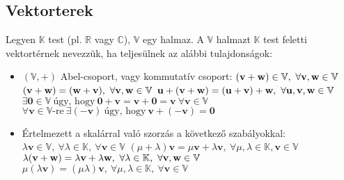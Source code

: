 \subsection{Vektorterek}
Legyen $\mathbb{K}$ test (pl. $\mathbb{R}$ vagy $\mathbb{C}$), $\mathbb{V}$ egy halmaz. A $\mathbb{V}$ halmazt $\mathbb{K}$ test feletti
vektortérnek nevezzük, ha teljesülnek az alábbi tulajdonságok:
\begin{itemize}
\item $(\mathbb{V}, +)$ Abel-csoport, vagy kommutatív csoport:
\subitem $(\mathbf{v} + \mathbf{w}) \in \mathbb{V}, ~ \forall \mathbf{v}, \mathbf{w} \in \mathbb{V}$
\subitem $(\mathbf{v} + \mathbf{w}) = (\mathbf{w} + \mathbf{v}), ~ \forall \mathbf{v}, \mathbf{w} \in \mathbb{V}$
\subitem $\mathbf{u} + (\mathbf{v} + \mathbf{w}) =(\mathbf{u} + \mathbf{v}) + \mathbf{w}, ~ \forall \mathbf{u},\mathbf{v}, \mathbf{w} \in \mathbb{V}$
\subitem $\exists \mathbf{0} \in \mathbb{V} ~ \textrm{úgy, hogy} ~ \mathbf{0} + \mathbf{v} = \mathbf{v} + \mathbf{0} = \mathbf{v} ~ \forall \mathbf{v}\in\mathbb{V}$
\subitem $ \forall \mathbf{v}\in\mathbb{V}\textrm{-re} ~ \exists (-\mathbf{v}) ~ \textrm{úgy, hogy} ~  \mathbf{v}+(-\mathbf{v})=\mathbf{0}$

\item Értelmezett a skalárral való szorzás a következő szabályokkal:
\subitem $\lambda \mathbf{v} \in \mathbb V, ~ \forall \lambda \in \mathbb{K}, ~ \forall \mathbf{v} \in \mathbb{V}$
\subitem $(\mu + \lambda) \mathbf{v} = \mu \mathbf{v} + \lambda\mathbf{v} , ~ \forall \mu, \lambda \in \mathbb{K}, \mathbf{v} \in \mathbb{V}$
\subitem $\lambda (\mathbf{v} + \mathbf{w}) = \lambda \mathbf{v} + \lambda \mathbf{w}, ~ \forall \lambda \in \mathbb{K}, ~ \forall \mathbf{v}, \mathbf{w} \in \mathbb{V}$
\subitem $\mu (\lambda \mathbf{v}) = (\mu \lambda)\mathbf{v} , ~ \forall \mu, \lambda \in \mathbb{K},~ \forall \mathbf{v} \in \mathbb{V}$

\end{itemize}


